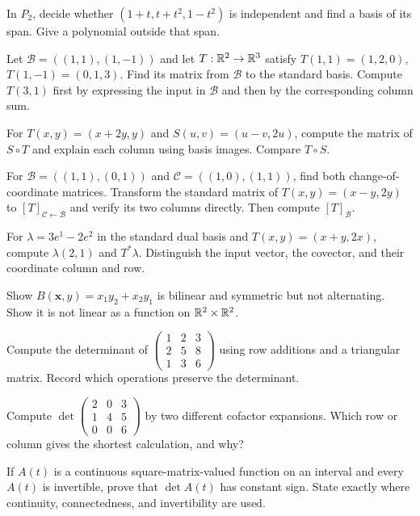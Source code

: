 \begin{exercise}
In $P_2$, decide whether $(1+t,t+t^2,1-t^2)$ is independent and find
a basis of its span. Give a polynomial outside that span.
\end{exercise}
\begin{exercise}
Let $\mathcal B=((1,1),(1,-1))$ and let $T:\mathbb{R}^2\to\mathbb{R}^3$ satisfy
$T(1,1)=(1,2,0)$, $T(1,-1)=(0,1,3)$. Find its matrix from
$\mathcal B$ to the standard basis. Compute $T(3,1)$ first by expressing
the input in $\mathcal B$ and then by the corresponding column sum.
\end{exercise}
\begin{exercise}
For $T(x,y)=(x+2y,y)$ and $S(u,v)=(u-v,2u)$, compute the matrix
of $S\circ T$ and explain each column using basis images. Compare $T\circ S$.
\end{exercise}
\begin{exercise}
For $\mathcal B=((1,1),(0,1))$ and $\mathcal C=((1,0),(1,1))$,
find both change-of-coordinate matrices. Transform the standard matrix of
$T(x,y)=(x-y,2y)$ to $[T]_{\mathcal C\leftarrow\mathcal B}$ and
verify its two columns directly. Then compute $[T]_{\mathcal B}$.
\end{exercise}
\begin{exercise}
For $\lambda=3e^1-2e^2$ in the standard dual basis and $T(x,y)=(x+y,2x)$,
compute $\lambda(2,1)$ and $T^*\lambda$. Distinguish the input vector,
the covector, and their coordinate column and row.
\end{exercise}
\begin{exercise}
Show $B(\mathbf{x},y)=x_1y_2+x_2y_1$ is bilinear and symmetric but not alternating.
Show it is not linear as a function on $\mathbb{R}^2\times\mathbb{R}^2$.
\end{exercise}
\begin{exercise}
Compute the determinant of
$\left(\begin{matrix}1&2&3\\2&5&8\\1&3&6\end{matrix}\right)$
using row additions and a triangular matrix. Record which operations
preserve the determinant.
\end{exercise}
\begin{exercise}
Compute $\det\left(\begin{matrix}2&0&3\\1&4&5\\0&0&6\end{matrix}\right)$
by two different cofactor expansions. Which row or column gives the
shortest calculation, and why?
\end{exercise}
\begin{exercise}
If $A(t)$ is a continuous square-matrix-valued function on an interval
and every $A(t)$ is invertible, prove that $\det A(t)$ has constant sign.
State exactly where continuity, connectedness, and invertibility are used.
\end{exercise}

